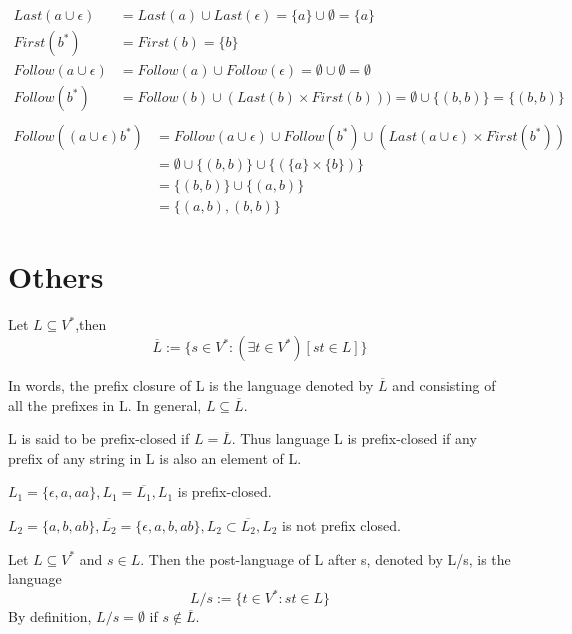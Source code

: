 \begin{align*}
	Last(a\cup \epsilon) &= Last(a) \cup Last(\epsilon)=\{a\} \cup \emptyset=\{a\}\\
	First(b^\ast) &= First(b) = \{b\}\\
	Follow(a\cup \epsilon)&=Follow(a)\cup Follow(\epsilon)=\emptyset \cup \emptyset = \emptyset\\
	Follow(b^\ast)&=Follow(b)\cup (Last(b)\times First(b)))=\emptyset\cup \{(b,b)\}=\{(b,b)\}\\
\end{align*}
\begin{align*}
Follow((a\cup \epsilon)b^\ast)&=Follow(a\cup\epsilon)\cup Follow(b^\ast)\cup (Last(a\cup\epsilon)\times First(b^\ast))\\
&=\emptyset\cup \{(b,b)\}\cup\{(\{a\}\times \{b\})\}\\
&=\{(b,b)\}\cup\{(a,b)\}\\
&=\{(a,b),(b,b)\}
\end{align*}


\section{Others}

\begin{definition}
	Let $L\subseteq V^*$,then
	$$\overline{L} := \{s\in V^*:(\exists t\in V^*)[st\in L]\}$$
\end{definition}
In words, the prefix closure of L is the language denoted by $\overline{L}$ and consisting of all the prefixes in L. In general, $L\subseteq \overline{L}$.

L is said to be prefix-closed if $L = \overline{L}$. Thus language L is prefix-closed if any prefix of any string in L is also an element of L.

$L_1 = \{\epsilon,a,aa\}, L_1 = \overline{L_1}, L_{1}$ is prefix-closed.

$L_2 = \{a,b,ab\}, \overline{L_2} = \{\epsilon,a,b,ab\}, L_2 \subset \overline{L_2}, L_2$ is not prefix closed.

\hfill

\begin{definition}
Let $L\subseteq V^{\ast}$ and $s\in L$. Then the post-language of L after s, denoted by L/s, is the language
$$ L/s := \{t\in V^{\ast}:st\in L\}$$
By definition, $L/s = \emptyset$ if $s \notin \overline{L}$.
\end{definition}

